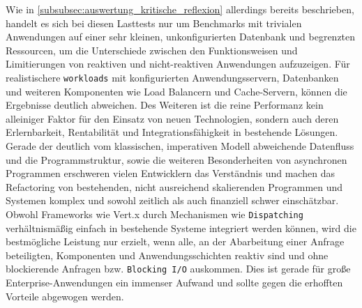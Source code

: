 Wie in \ref{subsubsec:auswertung_kritische_reflexion} allerdings bereits beschrieben, handelt es sich bei diesen Lasttests nur um
Benchmarks mit trivialen Anwendungen auf einer sehr kleinen, unkonfigurierten Datenbank und begrenzten Ressourcen, um
die Unterschiede zwischen den Funktionsweisen und Limitierungen von reaktiven und nicht-reaktiven Anwendungen aufzuzeigen.
Für realistischere \verb|workloads| mit konfigurierten Anwendungsservern, Datenbanken und weiteren Komponenten wie Load Balancern und
Cache-Servern,  können die Ergebnisse deutlich abweichen.
Des Weiteren ist die reine Performanz kein alleiniger Faktor für den Einsatz von neuen Technologien, sondern auch deren
Erlernbarkeit, Rentabilität und Integrationsfähigkeit in bestehende Lösungen.
Gerade der deutlich vom klassischen, imperativen Modell abweichende Datenfluss und die Programmstruktur, sowie die weiteren Besonderheiten
von asynchronen Programmen erschweren vielen Entwicklern das Verständnis und machen das Refactoring von bestehenden, nicht ausreichend
skalierenden Programmen und Systemen komplex und sowohl zeitlich als auch finanziell schwer einschätzbar.
Obwohl Frameworks wie Vert.x durch Mechanismen wie \verb|Dispatching| verhältnismäßig einfach in bestehende Systeme integriert werden
können, wird die bestmögliche Leistung nur erzielt, wenn alle, an der Abarbeitung einer Anfrage beteiligten, Komponenten und
Anwendungsschichten reaktiv sind und ohne blockierende Anfragen bzw. \verb|Blocking I/O| auskommen. Dies ist gerade für
große Enterprise-Anwendungen ein immenser Aufwand und sollte gegen die erhofften Vorteile abgewogen werden.